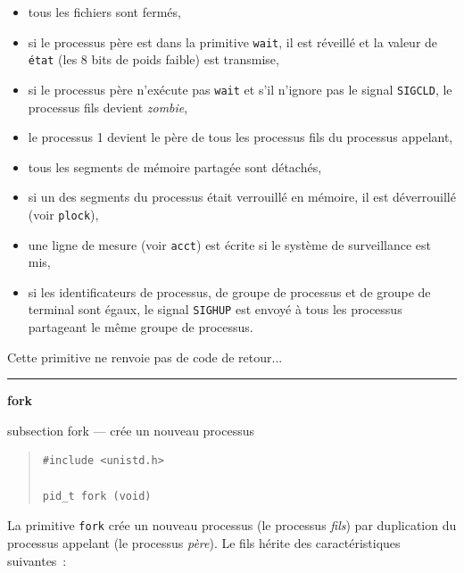 \documentclass [twoside] {report}
\newcommand {\primitive} [1]
    {
	\phantomsection
	{\large \textbf {#1}}
	\addcontentsline {toc} {subsection} {#1}
    }
\newcommand {\separation}
    {
	\vspace {5mm}
	\nopagebreak
	\hrule
    }
\begin{document}
\begin {itemize}
\item tous les fichiers sont fermés,
\item si le processus père est dans la primitive
\texttt {wait}, il est réveillé et la valeur de \texttt {état}
(les 8 bits de poids faible) est transmise,
\item si le processus père n'exécute pas \texttt {wait} et
s'il n'ignore pas le signal \texttt {SIGCLD}, le
processus fils devient \textit {zombie},
\item le processus 1 devient le père de tous les
processus fils du processus appelant,
\item tous les segments de mémoire partagée sont
détachés,
\item si un des segments du processus était
verrouillé en mémoire, il est déverrouillé (voir
\texttt {plock}),
\item une ligne de mesure (voir \texttt {acct}) est écrite
si le système de surveillance est mis,
\item si les identificateurs de processus, de groupe
de processus et de groupe de terminal sont égaux,
le signal \texttt {SIGHUP} est envoyé à tous les
processus partageant le même groupe de
processus.
\end {itemize}

Cette primitive ne renvoie pas de code de
retour...




\separation
\primitive {fork} --- crée un nouveau processus

\begin {quote}
\begin {verbatim}
#include <unistd.h>

pid_t fork (void)
\end{verbatim}
\end {quote}

La primitive \texttt {fork} crée un nouveau processus
(le processus \textit {fils})
par duplication du processus appelant (le
processus \textit {père}). Le fils hérite des
caractéristiques suivantes~:
\end{document}
